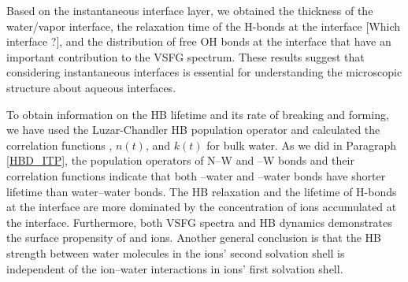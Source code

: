 Based on the instantaneous interface layer, we obtained 
the thickness of the water/vapor interface, the relaxation time of the H-bonds at the interface [Which interface ?], 
and the distribution of free OH bonds at the interface that have an important contribution to the VSFG spectrum.
These results suggest that considering instantaneous interfaces is essential for understanding the microscopic structure about aqueous interfaces.

To obtain information on the HB lifetime and its rate of breaking and forming, we have used the Luzar-Chandler HB population operator and calculated the correlation functions \CHB, $n(t)$, and $k(t)$ for bulk water. 
As we did in Paragraph \ref{HBD_ITP}, the population operators of N--W 
and \I--W bonds and their correlation functions 
indicate that both \nitrate--water and \I--water bonds have shorter lifetime than water--water bonds.
The HB relaxation and the lifetime of H-bonds
at the interface are more dominated by the concentration of ions accumulated at the interface. 
Furthermore, both VSFG spectra and HB dynamics demonstrates the surface propensity of \nitrate and \I ions.
Another general conclusion is that the HB strength between water molecules in the ions' second solvation shell is independent 
of the ion--water interactions in ions' first solvation shell.

